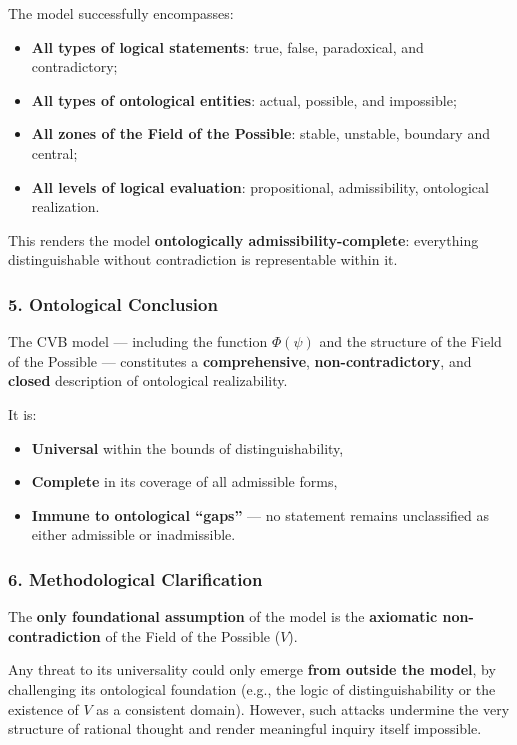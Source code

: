 \documentclass[12pt]{article}
\begin{document}
The model successfully encompasses:

\begin{itemize}
\item \textbf{All types of logical statements}: true, false, paradoxical, and contradictory;
\item \textbf{All types of ontological entities}: actual, possible, and impossible;
\item \textbf{All zones of the Field of the Possible}: stable, unstable, boundary and central;
\item \textbf{All levels of logical evaluation}: propositional, admissibility, ontological realization.
\end{itemize}

This renders the model \textbf{ontologically admissibility-complete}: everything distinguishable without contradiction is representable within it.

\subsubsection*{5. Ontological Conclusion}

The CVB model — including the function $\Phi(\psi)$ and the structure of the Field of the Possible — constitutes a \textbf{comprehensive}, \textbf{non-contradictory}, and \textbf{closed} description of ontological realizability.

It is:

\begin{itemize}
\item \textbf{Universal} within the bounds of distinguishability,
\item \textbf{Complete} in its coverage of all admissible forms,
\item \textbf{Immune to ontological ``gaps''} — no statement remains unclassified as either admissible or inadmissible.
\end{itemize}

\subsubsection*{6. Methodological Clarification}

The \textbf{only foundational assumption} of the model is the \textbf{axiomatic non-contradiction} of the Field of the Possible ($V$).

Any threat to its universality could only emerge \textbf{from outside the model}, by challenging its ontological foundation (e.g., the logic of distinguishability or the existence of $V$ as a consistent domain). However, such attacks undermine the very structure of rational thought and render meaningful inquiry itself impossible.
\end{document}

